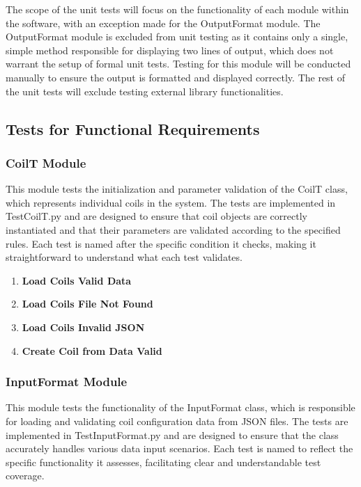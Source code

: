 \documentclass[12pt, titlepage]{article}
\newcommand{\UTthettnum}{UT\theuttnum}
\begin{document}
The scope of the unit tests will focus on the functionality of each module within the software, with an exception made for the OutputFormat module. The OutputFormat module is excluded from unit testing as it contains only a single, simple method responsible for displaying two lines of output, which does not warrant the setup of formal unit tests. Testing for this module will be conducted manually to ensure the output is formatted and displayed correctly. The rest of the unit tests will exclude testing external library functionalities.
\subsection{Tests for Functional Requirements}

\subsubsection{CoilT Module}

This module tests the initialization and parameter validation of the CoilT class, which represents individual coils in the system. The tests are implemented in TestCoilT.py and are designed to ensure that coil objects are correctly instantiated and that their parameters are validated according to the specified rules. Each test is named after the specific condition it checks, making it straightforward to understand what each test validates.

\begin{enumerate}
  \item[\refstepcounter{uttnum} \UTthettnum:] \textbf{Load Coils Valid Data}
  \item[\refstepcounter{uttnum} \UTthettnum:] \textbf{Load Coils File Not Found}
  \item[\refstepcounter{uttnum} \UTthettnum:] \textbf{Load Coils Invalid JSON}
  \item[\refstepcounter{uttnum} \UTthettnum:] \textbf{Create Coil from Data Valid}

\end{enumerate}

\subsubsection{InputFormat Module}

This module tests the functionality of the InputFormat class, which is responsible for loading and validating coil configuration data from JSON files. The tests are implemented in TestInputFormat.py and are designed to ensure that the class accurately handles various data input scenarios. Each test is named to reflect the specific functionality it assesses, facilitating clear and understandable test coverage.
\end{document}
